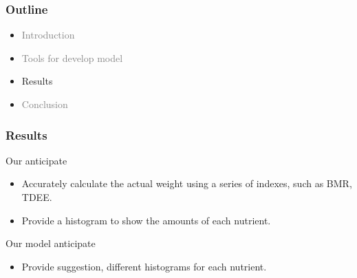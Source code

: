 \documentclass[fleqn]{beamer}
\begin{document}
\begin{frame}
\frametitle{Outline}
\begin{itemize}
        \item \textcolor{gray}{Introduction}
        \vspace{0.15 cm}
        \item \textcolor{gray}{Tools for develop model}
        \vspace{0.15 cm}
        \item Results
        \vspace{0.15 cm}
        \item \textcolor{gray}{ Conclusion}
        \vspace{0.15 cm}
\end{itemize}
\end{frame}
\begin{frame}
\frametitle{Results}
     \begin{minipage}[t]{0.48\textwidth}
        \begin{block}{Our anticipate}
            \begin{itemize}
                \item Accurately calculate the actual weight using a series of indexes, such as BMR, TDEE. \\
                \item Provide a histogram to show the amounts of each nutrient. 
            \end{itemize}
        \end{block}
    \end{minipage}%
    \hfill
    \begin{minipage}[t]{0.48\textwidth}
        \begin{block}{Our model anticipate}
            \begin{itemize}
                \item Provide suggestion, different histograms for each nutrient.
            \end{itemize}
        \end{block}
\end{minipage}
\end{frame}
\end{document}

